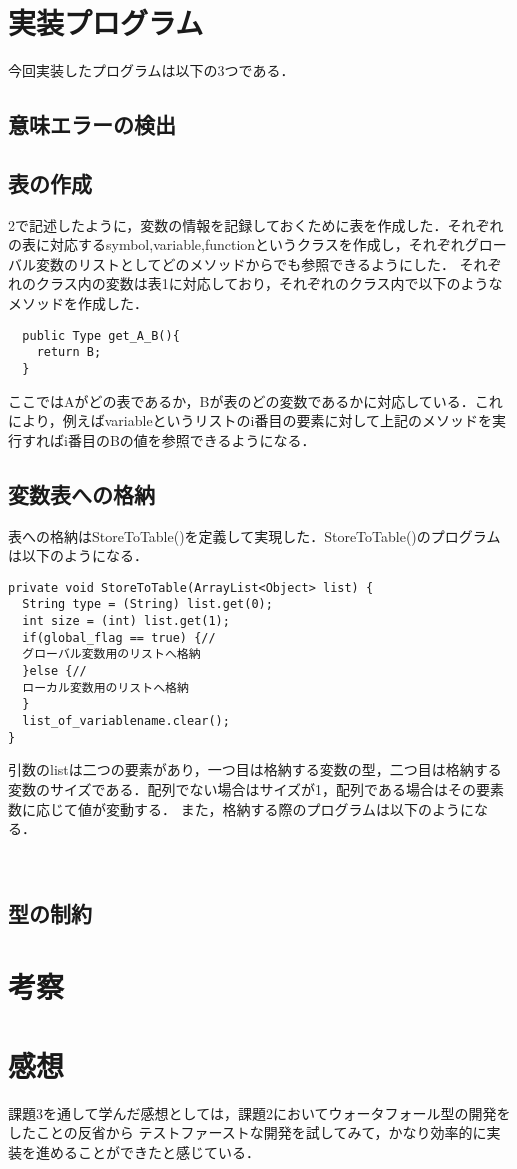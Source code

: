 \documentclass[dvipdfmx]{jarticle}
\begin{document}
\section{実装プログラム}
今回実装したプログラムは以下の3つである．
\subsection{意味エラーの検出}
\subsection{表の作成}
2で記述したように，変数の情報を記録しておくために表を作成した．それぞれの表に対応するsymbol,variable,functionというクラスを作成し，それぞれグローバル変数のリストとしてどのメソッドからでも参照できるようにした．
それぞれのクラス内の変数は表1に対応しており，それぞれのクラス内で以下のようなメソッドを作成した．
\begin{lstlisting}
  public Type get_A_B(){
    return B;
  }
\end{lstlisting}
ここではAがどの表であるか，Bが表のどの変数であるかに対応している．これにより，例えばvariableというリストのi番目の要素に対して上記のメソッドを実行すればi番目のBの値を参照できるようになる．
\subsection{変数表への格納}
表への格納はStoreToTable()を定義して実現した．StoreToTable()のプログラムは以下のようになる．
\begin{lstlisting}
private void StoreToTable(ArrayList<Object> list) {
  String type = (String) list.get(0);
  int size = (int) list.get(1);
  if(global_flag == true) {//
  グローバル変数用のリストへ格納
  }else {//
  ローカル変数用のリストへ格納
  }
  list_of_variablename.clear();
}
\end{lstlisting}
引数のlistは二つの要素があり，一つ目は格納する変数の型，二つ目は格納する変数のサイズである．配列でない場合はサイズが1，配列である場合はその要素数に応じて値が変動する．
また，格納する際のプログラムは以下のようになる．
\begin{lstlisting}
  
\end{lstlisting}
\subsection{型の制約}
\section{考察}
\section{感想}
課題3を通して学んだ感想としては，課題2においてウォータフォール型の開発をしたことの反省から
テストファーストな開発を試してみて，かなり効率的に実装を進めることができたと感じている．
\begin{thebibliography}{1}
\end{thebibliography}
\end{document}

